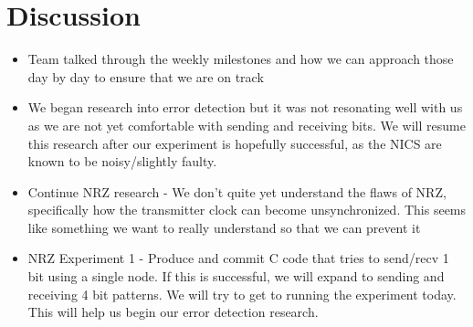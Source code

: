 \documentclass{article}
\begin{document}
\section*{Discussion}
\begin{itemize}
\item Team talked through the weekly milestones and how we can approach those day by day to ensure that we are on track 
\item We began research into error detection but it was not resonating well with us as we are not yet comfortable with sending and receiving bits. We will resume this research after our experiment is hopefully successful, as the NICS are known to be noisy/slightly faulty. 
\item Continue NRZ research - We don't quite yet understand the flaws of NRZ, specifically how the transmitter clock can become unsynchronized. This seems like something we want to really understand so that we can prevent it 
\item NRZ Experiment 1 - Produce and commit C code that tries to send/recv 1 bit using a single node. If this is successful, we will expand to sending and receiving 4 bit patterns. We will try to get to running the experiment today. This will help us begin our error detection research. 
\end{itemize}
\end{document}
